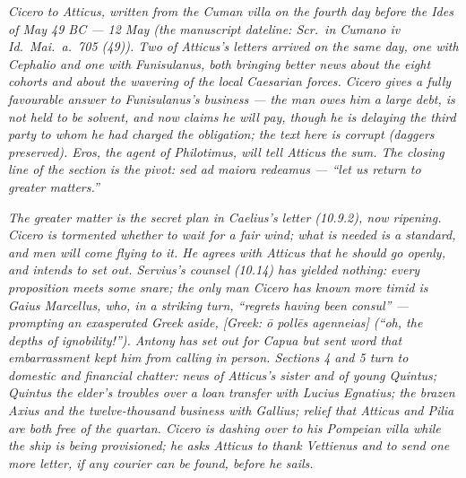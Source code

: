 
\textit{Cicero to Atticus, written from the Cuman villa
on the fourth day before the Ides of May 49 BC --- 12 May
(the manuscript dateline: \textit{Scr.\ in Cumano iv
Id.\ Mai.\ a.\ 705 (49)}). Two of Atticus's letters
arrived on the same day, one with Cephalio and one with
Funisulanus, both bringing better news about the eight
cohorts and about the wavering of the local Caesarian
forces. Cicero gives a fully favourable answer to
Funisulanus's business --- the man owes him a large
debt, is not held to be solvent, and now claims he will
pay, though he is delaying the third party to whom he
had charged the obligation; the text here is corrupt
(daggers preserved). Eros, the agent of Philotimus, will
tell Atticus the sum. The closing line of the section
is the pivot: \textit{sed ad maiora redeamus} --- ``let
us return to greater matters.''}

\textit{The greater matter is the secret plan in
Caelius's letter (10.9.2), now ripening. Cicero is
tormented whether to wait for a fair wind; what is
needed is a standard, and men will come flying to it.
He agrees with Atticus that he should go openly, and
intends to set out. Servius's counsel (10.14) has
yielded nothing: every proposition meets some snare; the
only man Cicero has known more timid is Gaius Marcellus,
who, in a striking turn, ``regrets having been consul''
--- prompting an exasperated Greek aside, \textit{[Greek:
\=o poll\=es agenneias]} (``oh, the depths of
ignobility!''). Antony has set out for Capua but sent
word that embarrassment kept him from calling in person.
Sections 4 and 5 turn to domestic and financial chatter:
news of Atticus's sister and of young Quintus; Quintus
the elder's troubles over a loan transfer with Lucius
Egnatius; the brazen Axius and the twelve-thousand
business with Gallius; relief that Atticus and Pilia
are both free of the quartan. Cicero is dashing over
to his Pompeian villa while the ship is being
provisioned; he asks Atticus to thank Vettienus and to
send one more letter, if any courier can be found,
before he sails.}
